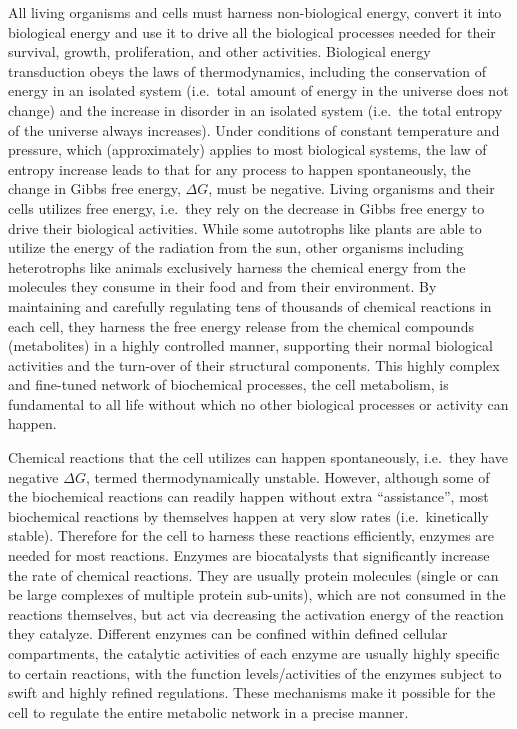\documentclass[12pt,twoside,openany,\mydriver]{thesis}  %
\begin{document}
All living organisms and cells must harness non-biological energy, convert it into biological energy and use it to drive all the biological processes needed for their survival, growth, proliferation, and other activities. Biological energy transduction obeys the laws of thermodynamics, including the conservation of energy in an isolated system (i.e.~total amount of energy in the universe does not change) and the increase in disorder in an isolated system (i.e.~the total entropy of the universe always increases). Under conditions of constant temperature and pressure, which (approximately) applies to most biological systems, the law of entropy increase leads to that for any process to happen spontaneously, the change in Gibbs free energy, \(\Delta G\), must be negative. Living organisms and their cells utilizes free energy, i.e.~they rely on the decrease in Gibbs free energy to drive their biological activities. While some autotrophs like plants are able to utilize the energy of the radiation from the sun, other organisms including heterotrophs like animals exclusively harness the chemical energy from the molecules they consume in their food and from their environment. By maintaining and carefully regulating tens of thousands of chemical reactions in each cell, they harness the free energy release from the chemical compounds (metabolites) in a highly controlled manner, supporting their normal biological activities and the turn-over of their structural components. This highly complex and fine-tuned network of biochemical processes, the cell metabolism, is fundamental to all life without which no other biological processes or activity can happen.

Chemical reactions that the cell utilizes can happen spontaneously, i.e.~they have negative \(\Delta G\), termed thermodynamically unstable. However, although some of the biochemical reactions can readily happen without extra ``assistance'', most biochemical reactions by themselves happen at very slow rates (i.e.~kinetically stable). Therefore for the cell to harness these reactions efficiently, enzymes are needed for most reactions. Enzymes are biocatalysts that significantly increase the rate of chemical reactions. They are usually protein molecules (single or can be large complexes of multiple protein sub-units), which are not consumed in the reactions themselves, but act via decreasing the activation energy of the reaction they catalyze. Different enzymes can be confined within defined cellular compartments, the catalytic activities of each enzyme are usually highly specific to certain reactions, with the function levels/activities of the enzymes subject to swift and highly refined regulations. These mechanisms make it possible for the cell to regulate the entire metabolic network in a precise manner.
\end{document}

